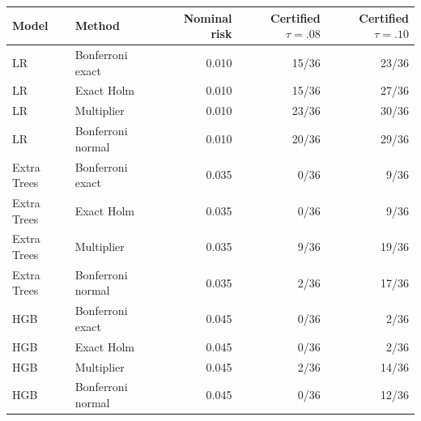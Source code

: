 \begin{tabular}{llrrr}
\toprule
Model & Method & Nominal risk & Certified $\tau=.08$ & Certified $\tau=.10$ \\
\midrule
LR & Bonferroni exact & 0.010 & 15/36 & 23/36 \\
LR & Exact Holm & 0.010 & 15/36 & 27/36 \\
LR & Multiplier & 0.010 & 23/36 & 30/36 \\
LR & Bonferroni normal & 0.010 & 20/36 & 29/36 \\
Extra Trees & Bonferroni exact & 0.035 & 0/36 & 9/36 \\
Extra Trees & Exact Holm & 0.035 & 0/36 & 9/36 \\
Extra Trees & Multiplier & 0.035 & 9/36 & 19/36 \\
Extra Trees & Bonferroni normal & 0.035 & 2/36 & 17/36 \\
HGB & Bonferroni exact & 0.045 & 0/36 & 2/36 \\
HGB & Exact Holm & 0.045 & 0/36 & 2/36 \\
HGB & Multiplier & 0.045 & 2/36 & 14/36 \\
HGB & Bonferroni normal & 0.045 & 0/36 & 12/36 \\
\bottomrule
\end{tabular}
